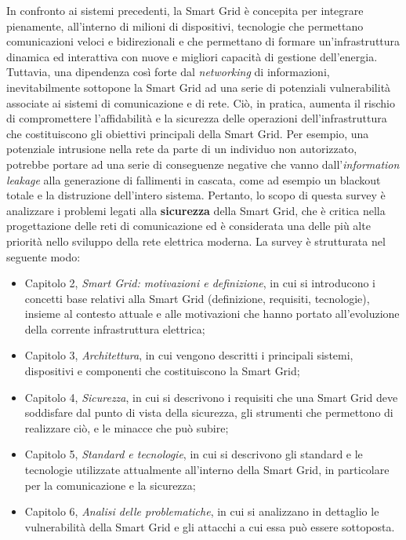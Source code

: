 In confronto ai sistemi precedenti, la Smart Grid è concepita per integrare pienamente, all'interno di milioni di dispositivi, tecnologie che permettano comunicazioni veloci e bidirezionali e che permettano di formare un'infrastruttura dinamica ed interattiva con nuove e migliori capacità di gestione dell'energia. Tuttavia, una dipendenza così forte dal \textit{networking} di informazioni, inevitabilmente sottopone la Smart Grid ad una serie di potenziali vulnerabilità associate ai sistemi di comunicazione e di rete. Ciò, in pratica, aumenta il rischio di compromettere l'affidabilità e la sicurezza delle operazioni dell'infrastruttura che costituiscono gli obiettivi principali della Smart Grid. Per esempio, una potenziale intrusione nella rete da parte di un individuo non autorizzato, potrebbe portare ad una serie di conseguenze negative che vanno dall'\textit{information leakage} alla generazione di fallimenti in cascata, come ad esempio un blackout totale e la distruzione dell'intero sistema. Pertanto, lo scopo di questa survey è analizzare i problemi legati alla \textbf{sicurezza} della Smart Grid, che è critica nella progettazione delle reti di comunicazione ed è considerata una delle più alte priorità nello sviluppo della rete elettrica moderna.
\newline \newline
La survey è strutturata nel seguente modo:
\begin{itemize}
\item Capitolo 2, \textit{Smart Grid: motivazioni e definizione}, in cui si introducono i concetti base relativi alla Smart Grid (definizione, requisiti, tecnologie), insieme al contesto attuale e alle motivazioni che hanno portato all'evoluzione della corrente infrastruttura elettrica;
\item Capitolo 3, \textit{Architettura}, in cui vengono descritti i principali sistemi, dispositivi e componenti che costituiscono la Smart Grid;
\item Capitolo 4, \textit{Sicurezza}, in cui si descrivono i requisiti che una Smart Grid deve soddisfare dal punto di vista della sicurezza, gli strumenti che permettono di realizzare ciò, e le minacce che può subire;
\item Capitolo 5, \textit{Standard e tecnologie}, in cui si descrivono gli standard e le tecnologie utilizzate attualmente all'interno della Smart Grid, in particolare per la comunicazione e la sicurezza;
\item Capitolo 6, \textit{Analisi delle problematiche}, in cui si analizzano in dettaglio le vulnerabilità della Smart Grid e gli attacchi a cui essa può essere sottoposta.
\end{itemize}